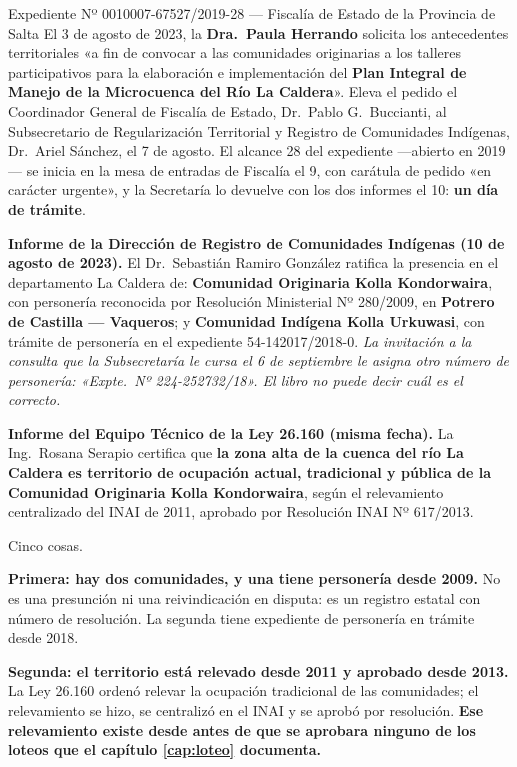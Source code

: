 \begin{ficha}{Expediente Nº 0010007-67527/2019-28 --- Fiscalía de Estado de la Provincia de Salta}
El 3 de agosto de 2023, la \textbf{Dra.\ Paula Herrando} solicita los antecedentes
territoriales «a fin de convocar a las comunidades originarias a los talleres participativos
para la elaboración e implementación del \textbf{Plan Integral de Manejo de la Microcuenca del
Río La Caldera}». Eleva el pedido el Coordinador General de Fiscalía de Estado,
Dr.\ Pablo G.\ Buccianti, al Subsecretario de Regularización Territorial y Registro de
Comunidades Indígenas, Dr.\ Ariel Sánchez, el 7 de agosto. El alcance 28 del expediente ---abierto en 2019--- se inicia en la mesa de
entradas de Fiscalía el 9, con carátula de pedido «en carácter urgente», y la Secretaría lo
devuelve con los dos informes el 10: \textbf{un día de trámite}.

\textbf{Informe de la Dirección de Registro de Comunidades Indígenas (10 de agosto de 2023).}
El Dr.\ Sebastián Ramiro González ratifica la presencia en el departamento La Caldera de:
\textbf{Comunidad Originaria Kolla Kondorwaira}, con personería reconocida por Resolución
Ministerial Nº 280/2009, en \textbf{Potrero de Castilla --- Vaqueros}; y \textbf{Comunidad
Indígena Kolla Urkuwasi}, con trámite de personería en el expediente 54-142017/2018-0. \textit{La invitación a la consulta que la Subsecretaría le cursa el 6 de septiembre le asigna otro número de personería: «Expte.\ Nº 224-252732/18». El libro no puede decir cuál es el correcto.}

\textbf{Informe del Equipo Técnico de la Ley 26.160 (misma fecha).} La Ing.\ Rosana Serapio
certifica que \textbf{la zona alta de la cuenca del río La Caldera es territorio de ocupación
actual, tradicional y pública de la Comunidad Originaria Kolla Kondorwaira}, según el
relevamiento centralizado del INAI de 2011, aprobado por Resolución INAI Nº 617/2013.
\end{ficha}

Cinco cosas.

\textbf{Primera: hay dos comunidades, y una tiene personería desde 2009.} No es una presunción
ni una reivindicación en disputa: es un registro estatal con número de resolución. La segunda
tiene expediente de personería en trámite desde 2018.

\textbf{Segunda: el territorio está relevado desde 2011 y aprobado desde 2013.} La Ley 26.160
ordenó relevar la ocupación tradicional de las comunidades; el relevamiento se hizo, se
centralizó en el INAI y se aprobó por resolución. \textbf{Ese relevamiento existe desde antes
de que se aprobara ninguno de los loteos que el capítulo \ref{cap:loteo} documenta.}

